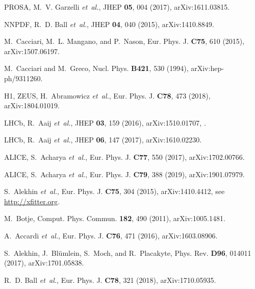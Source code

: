 \documentclass[a4paper,11pt]{article}
\begin{document}
\begin{thebibliography}{99}
PROSA, M.~V. Garzelli {\em et~al.},
\newblock JHEP {\bf 05}, 004 (2017), arXiv:1611.03815.

NNPDF, R.~D. Ball {\em et~al.},
\newblock JHEP {\bf 04}, 040 (2015), arXiv:1410.8849.

M.~Cacciari, M.~L. Mangano, and P.~Nason,
\newblock Eur. Phys. J. {\bf C75}, 610 (2015), arXiv:1507.06197.

M.~Cacciari and M.~Greco,
\newblock Nucl. Phys. {\bf B421}, 530 (1994), arXiv:hep-ph/9311260.

H1, ZEUS, H.~Abramowicz {\em et~al.},
\newblock Eur. Phys. J. {\bf C78}, 473 (2018), arXiv:1804.01019.

LHCb, R.~Aaij {\em et~al.},
\newblock JHEP {\bf 03}, 159 (2016), arXiv:1510.01707,
.

LHCb, R.~Aaij {\em et~al.},
\newblock JHEP {\bf 06}, 147 (2017), arXiv:1610.02230.

ALICE, S.~Acharya {\em et~al.},
\newblock Eur. Phys. J. {\bf C77}, 550 (2017), arXiv:1702.00766.

ALICE, S.~Acharya {\em et~al.},
\newblock Eur. Phys. J. {\bf C79}, 388 (2019), arXiv:1901.07979.

S.~Alekhin {\em et~al.},
\newblock Eur. Phys. J. {\bf C75}, 304 (2015), arXiv:1410.4412,
\newblock see \url{http://xfitter.org}.

M.~Botje,
\newblock Comput. Phys. Commun. {\bf 182}, 490 (2011), arXiv:1005.1481.

A.~Accardi {\em et~al.},
\newblock Eur. Phys. J. {\bf C76}, 471 (2016), arXiv:1603.08906.

S.~Alekhin, J.~Bl{\"u}mlein, S.~Moch, and R.~Placakyte,
\newblock Phys. Rev. {\bf D96}, 014011 (2017), arXiv:1701.05838.

R.~D. Ball {\em et~al.},
\newblock Eur. Phys. J. {\bf C78}, 321 (2018), arXiv:1710.05935.


\end{thebibliography}
\end{document}
